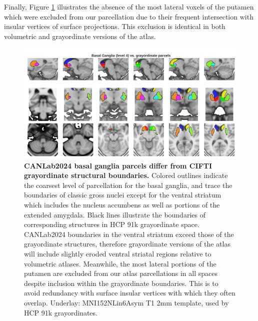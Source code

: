 \documentclass[10pt,letterpaper]{article}
\begin{document}
Finally, Figure \ref{bg-vs-cifti-figure} illustrates the absence of the most lateral voxels of the putamen which were excluded from our parcellation due to their frequent intersection with insular vertices of surface projections. This exclusion is identical in both volumetric and grayordinate versions of the atlas.

\begin{figure}[t!]
\centering
\includegraphics[width=\linewidth]{images/bg_vs_cifti.png}
\caption{
{\bf
CANLab2024 basal ganglia parcels differ from CIFTI grayordinate structural boundaries.} 
Colored outlines indicate the coarsest level of parcellation for the basal ganglia, and trace the boundaries of classic gross nuclei except for the ventral striatum which includes the nucleus accumbens as well as portions of the extended amygdala. Black lines illustrate the boundaries of corresponding structures in HCP 91k grayordinate space. CANLab2024 boundaries in the ventral striatum exceed those of the grayordinate structures, therefore grayordinate versions of the atlas will include slightly eroded ventral striatal regions relative to volumetric atlases. Meanwhile, the most lateral portions of the putamen are excluded from our atlas parcellations in all spaces despite inclusion within the grayordinate boundaries. This is to avoid redundancy with surface insular vertices with which they often overlap. Underlay: MNI152NLin6Asym T1 2mm template, used by HCP 91k grayordinates.}
\label{bg-vs-cifti-figure}
\end{figure}
\end{document}
